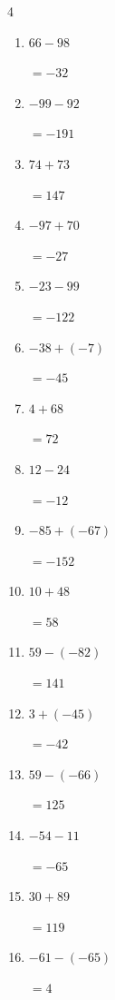 \begin{multicols}{4}
\begin{enumerate}
        $=-136$

  \item $66-98$

        $=-32$

  \item $-99-92$

        $=-191$

  \item $74+73$

        $=147$

  \item $-97+70$

        $=-27$

  \item $-23-99$

        $=-122$

  \item $-38+(-7)$

        $=-45$

  \item $4+68$

        $=72$

  \item $12-24$

        $=-12$

  \item $-85+(-67)$

        $=-152$

  \item $10+48$

        $=58$

  \item $59-(-82)$

        $=141$

  \item $3+(-45)$

        $=-42$

\columnbreak %

\resetques

  \item $59-(-66)$

        $=125$

  \item $-54-11$

        $=-65$

  \item $30+89$

        $=119$

  \item $-61-(-65)$

        $=4$


\end{enumerate}
\end{multicols}
